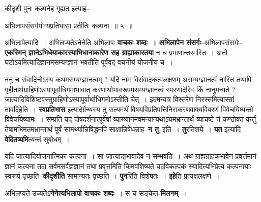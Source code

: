 \documentclass[article,12pt,a4paper]{memoir}
\begin{document}
	कीदृशी पुनः कल्पनेह गृह्यत इत्याह--  
	  
	अभिलापसंसर्गयोग्यप्रतिभासा प्रतीतिः कल्पना ॥ ५ ॥ 
	  
	अभिलापेत्यादि । अभिलप्यतेऽनेनेति अभिलापः \textbf{वाचकः शब्दः । अभिलापेन संसर्गः}--अभिलापसंसर्गः--\textbf{एकस्मिन् ज्ञानेऽभिधेयाकारस्याभिधानाकारेण सह ग्राह्याकारतया} न च प्रमाणान्तरमस्ति । अतो घटोऽयमित्यादिज्ञानमसम्यग्ज्ञानं भवतीति पूर्ववद् वचनीयं योजनीयं च ।
	\pend
      

	  \pstart ननु च संवादिनोऽस्य कथमसम्यग्ज्ञानत्वम् ? यदि नाम विसंवादकत्वलक्षणम् असम्यग्ज्ञानत्वं नास्ति तथापि गृहीतार्थग्राहिणोऽस्यापूर्वाधिगमाभावात् करणार्थाभावरूपमसम्यग्ज्ञानत्वं स्मरणादेरिव किं नानुमन्यते ? जात्यादिविशिष्टवस्तुग्राहिणोऽस्यापूर्वार्थाधिगमोऽस्तीति चेत् । इदमन्यत्र विस्तरेण निरस्तमित्यास्तां तावदिहेति । \textbf{स्वप्रतिभास} इत्यादेर्ग्रन्थस्य तु सत्यमर्थं विषयविप्रतिपत्तिनिराकरणवाक्यविवरणं विवेचयिष्यन्तो विवेचयिष्यामः । सम्प्रति यद् दोषदर्शनात्पूर्वेषां व्याख्यानमवमन्यान्यथाऽयमभ्रान्तार्थं व्याचष्टे तं कण्ठोक्तं कर्त्तुं तेषामभिमतमभ्रान्तार्थं पूर्वं सामर्थ्यान्निषिद्धमपि साक्षान्निषेधन्नाह--\textbf{न तु}--इति । \textbf{तु}रतिशये । \textbf{यत} इत्यादि \textbf{वेदितव्यमि}त्यन्तं सुबोधम् ।
	\pend
      

	  \pstart यदि जात्यादियोजनात्मिका कल्पना । सा जात्याद्यभावादेव न सम्भवति । अथ ग्राह्यग्राहकभावेन प्रवर्त्तमानं ज्ञानं कल्पना तदा सर्वमसर्वज्ञज्ञानं तथा प्रवृत्तमिति किमवशिष्यते यदविकल्पकं स्यादित्यभिप्रेत्य कल्पनायाः स्वरूपं पृच्छति--\textbf{कीदृशीति} सामान्यतः पृच्छति । \textbf{पुन}रिति विशेषतः । \textbf{इहे}ति प्रत्यक्षलक्षणे ।
	\pend
      

	  \pstart अभिलप्यते उच्यतेऽ\textbf{नेनेत्यभिलापो वाचकः शब्दः} । स च सङ्केत-\textbf{मिलनम्} ।
	\pend
	  \bigskip
	  \begingroup
	
\end{document}
